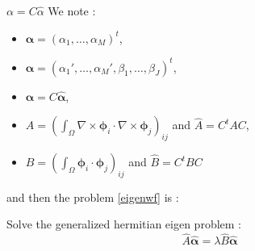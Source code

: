 \documentclass{beamer}
\newcommand{\curl}{{\nabla\times}}
\begin{document}
\begin{frame}{$\alpha=C\widehat{\alpha}$}
  We note :
  \begin{itemize}
  \item $\bm{\alpha}=(\alpha_1,\dots,\alpha_M)^t$,
  \item $\widehat{\bm{\alpha}}=(\alpha_1',\dots,\alpha_M',\beta_1,\dots,\beta_J)^t$,
  \item $\bm{\alpha} = C\widehat{\bm{\alpha}}$,
  \item $A=(\int_\Omega\curl\bm{\phi}_i\cdot\curl\bm{\phi}_j)_{ij}$ and $\widehat{A}=C^tAC$,
  \item $B=(\int_\Omega\bm{\phi}_i\cdot\bm{\phi}_j)_{ij}$ and $\widehat{B}=C^tBC$
  \end{itemize}
  and then the problem \ref{eigenwf} is :
  \begin{block}{Solve the generalized hermitian eigen problem :}
    \begin{equation}\label{eigenhat}
      \widehat{A}\widehat{\bm{\alpha}}=\lambda \widehat{B}\widehat{\bm{\alpha}}
    \end{equation}
  \end{block}
\end{frame}
\end{document}
